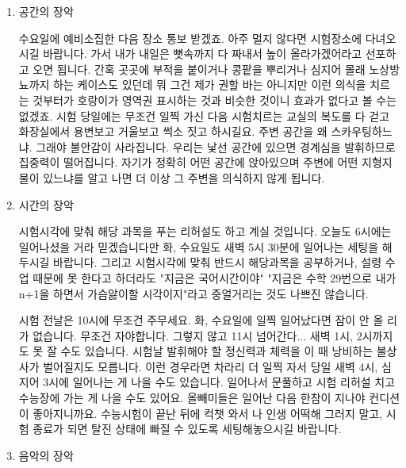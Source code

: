 \begin{enumerate}
    \item 공간의 장악
    \vspace{5mm}

    수요일에 예비소집한 다음 장소 통보 받겠죠. 아주 멀지 않다면 시험장소에 다녀오시길 바랍니다.
    가서 내가 내일은 뼛속까지 다 짜내서 높이 올라가겠어라고 선포하고 오면 됩니다.
    간혹 곳곳에 부적을 붙이거나 콩팥을 뿌리거나 심지어 몰래 노상방뇨까지 하는 케이스도 있던데 뭐 그건 제가 권할 바는 아니지만
    이런 의식을 치르는 것부터가 호랑이가 영역권 표시하는 것과 비슷한 것이니 효과가 없다고 볼 수는 없겠죠.
    시험 당일에는 무조건 일찍 가신 다음 시험치르는 교실의 복도를 다 걷고 화장실에서 용변보고 거울보고 썩소 짓고 하시길요.
    주변 공간을 왜 스카우팅하느냐. 그래야 불안감이 사라집니다. 우리는 낯선 공간에 있으면 경계심을 발휘하므로 집중력이 떨어집니다.
    자기가 정확히 어떤 공간에 앉아있으며 주변에 어떤 지형지물이 있느냐를 알고 나면 더 이상 그 주변을 의식하지 않게 됩니다.
    \vspace{5mm}

    \item  시간의 장악
    \vspace{5mm}

    시험시각에 맞춰 해당 과목을 푸는 리허설도 하고 계실 것입니다.
    오늘도 6시에는 일어나셨을 거라 믿겠습니다만 화, 수요일도 새벽 5시 30분에 일어나는 세팅을 해두시길 바랍니다.
    그리고 시험시각에 맞춰 반드시 해당과목을 공부하거나, 설령 수업 때문에 못 한다고 하더라도 "지금은 국어시간이야"
    "지금은 수학 29번으로 내가 n+1을 하면서 가슴앓이할 시각이지"라고 중얼거리는 것도 나쁘진 않습니다.
    \vspace{5mm}

    시험 전날은 10시에 무조건 주무세요. 화, 수요일에 일찍 일어났다면 잠이 안 올 리가 없습니다.
    무조건 자야합니다. 그렇지 않고 11시 넘어간다... 새벽 1시, 2시까지도 못 잘 수도 있습니다.
    시험날 발휘해야 할 정신력과 체력을 이 때 낭비하는 불상사가 벌어질지도 모릅니다.
    이런 경우라면 차라리 더 일찍 자서 당일 새벽 4시, 심지어 3시에 일어나는 게 나을 수도 있습니다.
    일어나서 문풀하고 시험 리허설 치고 수능장에 가는 게 나을 수도 있어요. 올빼미들은 일어난 다음 한참이 지나야 컨디션이 좋아지니까요.
    수능시험이 끝난 뒤에 컥챗 와서 나 인생 어떡해 그러지 말고, 시험 종료가 되면 탈진 상태에 빠질 수 있도록 세팅해놓으시길 바랍니다.
    \vspace{5mm}

    \item 음악의 장악
    \vspace{5mm}


\end{enumerate}
